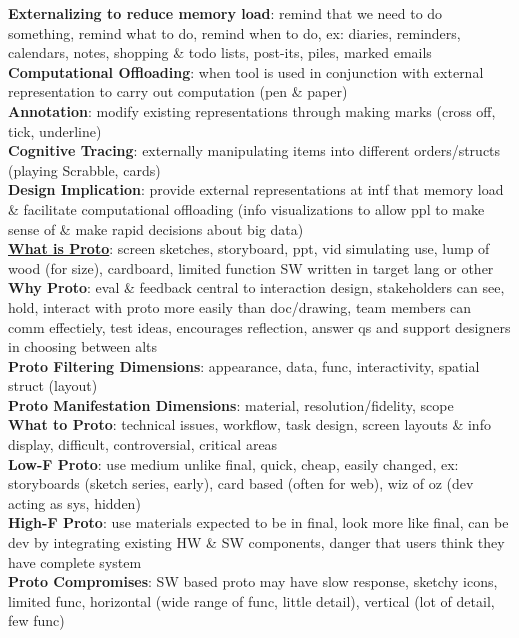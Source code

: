 \documentclass[a4paper]{article}
\begin{document}
\begin{multicols}{3}
        \textbf{Externalizing to reduce memory load}: remind that we need to do something, remind what to do, remind when to do, ex: diaries, reminders, calendars, notes, shopping \& todo lists, post-its, piles, marked emails\\
        \textbf{Computational Offloading}: when tool is used in conjunction with external representation to carry out computation (pen \& paper)\\
        \textbf{Annotation}: modify existing representations through making marks (cross off, tick, underline)\\
        \textbf{Cognitive Tracing}: externally manipulating items into different orders/structs (playing Scrabble, cards)\\
        \textbf{Design Implication}: provide external representations at intf that memory load \& facilitate computational offloading (info visualizations to allow ppl to make sense of \& make rapid decisions about big data)\\
        \underline{\textbf{What is Proto}}: screen sketches, storyboard, ppt, vid simulating use, lump of wood (for size), cardboard, limited function SW written in target lang or other\\
        \textbf{Why Proto}: eval \& feedback central to interaction design, stakeholders can see, hold, interact with proto more easily than doc/drawing, team members can comm effectiely, test ideas, encourages reflection, answer qs and support designers in choosing between alts\\
        \textbf{Proto Filtering Dimensions}: appearance, data, func, interactivity, spatial struct (layout)\\
        \textbf{Proto Manifestation Dimensions}: material, resolution/fidelity, scope\\
        \textbf{What to Proto}: technical issues, workflow, task design, screen layouts \& info display, difficult, controversial, critical areas\\
        \textbf{Low-F Proto}: use medium unlike final, quick, cheap, easily changed, ex: storyboards (sketch series, early), card based (often for web), wiz of oz (dev acting as sys, hidden)\\
        \textbf{High-F Proto}: use materials expected to be in final, look more like final, can be dev by integrating existing HW \& SW components, danger that users think they have complete system\\
        \textbf{Proto Compromises}: SW based proto may have slow response, sketchy icons, limited func, horizontal (wide range of func, little detail), vertical (lot of detail, few func)\\

\end{multicols}
\end{document}
